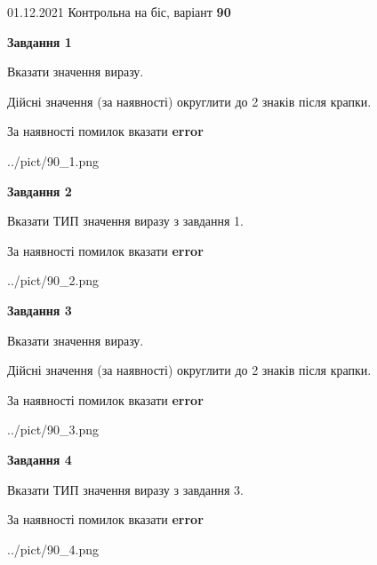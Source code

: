 \documentclass[11pt, ukrainian]{article}
\begin{document}
{01.12.2021 Контрольна на біс, варіант  \No \textbf { 90 }\par}
{
\begin {large}
{\begin {center}\textbf{Завдання 1}\end {center}}\par
Вказати значення виразу. \par
Дійсні значення (за наявності) округлити до 2 знаків після крапки. \par
За наявності помилок вказати \textbf{error}

\begin{center}
	{../pict/90_1.png}
\end{center}
\newpage

{\begin {center}\textbf{Завдання 2}\end {center}}\par
Вказати ТИП значення виразу з завдання 1. \par
За наявності помилок вказати \textbf{error}

\begin{center}
	{../pict/90_2.png}
\end{center}
\newpage

{\begin {center}\textbf{Завдання 3}\end {center}}\par
Вказати значення виразу. \par
Дійсні значення (за наявності) округлити до 2 знаків після крапки. \par
За наявності помилок вказати \textbf{error}

\begin{center}
	{../pict/90_3.png}
\end{center}
\newpage

{\begin {center}\textbf{Завдання 4}\end {center}}\par
Вказати ТИП значення виразу з завдання 3. \par
За наявності помилок вказати \textbf{error}

\begin{center}
	{../pict/90_4.png}
\end{center}
\newpage


\end{large}}
\end{document}
